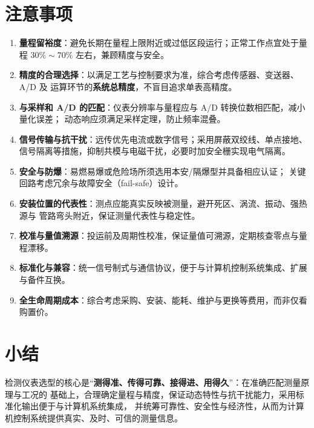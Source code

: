 \documentclass[12pt,a4paper]{ctexart}
\begin{document}
\section{注意事项}
\begin{enumerate}
  \item \textbf{量程留裕度}：避免长期在量程上限附近或过低区段运行；正常工作点宜处于量程
        $30\%\sim70\%$ 左右，兼顾精度与安全。
  \item \textbf{精度的合理选择}：以满足工艺与控制要求为准，综合考虑传感器、变送器、A/D 及
        运算环节的\textbf{系统总精度}，不盲目追求单表高精度。
  \item \textbf{与采样和 A/D 的匹配}：仪表分辨率与量程应与 A/D 转换位数相匹配，减小量化误差；
        动态响应须满足采样定理，防止频率混叠。
  \item \textbf{信号传输与抗干扰}：远传优先电流或数字信号；采用屏蔽双绞线、单点接地、
        信号隔离等措施，抑制共模与电磁干扰，必要时加安全栅实现电气隔离。
  \item \textbf{安全与防爆}：易燃易爆或危险场所须选用本安/隔爆型并具备相应认证；
        关键回路考虑冗余与故障安全（fail-safe）设计。
  \item \textbf{安装位置的代表性}：测点应能真实反映被测量，避开死区、涡流、振动、强热源与
        管路弯头附近，保证测量代表性与稳定性。
  \item \textbf{校准与量值溯源}：投运前及周期性校准，保证量值可溯源，定期核查零点与量程漂移。
  \item \textbf{标准化与兼容}：统一信号制式与通信协议，便于与计算机控制系统集成、扩展与备件互换。
  \item \textbf{全生命周期成本}：综合考虑采购、安装、能耗、维护与更换等费用，而非仅看购置价。
\end{enumerate}
 
\section{小结}
检测仪表选型的核心是“\textbf{测得准、传得可靠、接得进、用得久}”：在准确匹配测量原理与工况的
基础上，合理确定量程与精度，保证动态特性与抗干扰能力，采用标准化输出便于与计算机系统集成，
并统筹可靠性、安全性与经济性，从而为计算机控制系统提供真实、及时、可信的测量信息。
 
\end{document}
